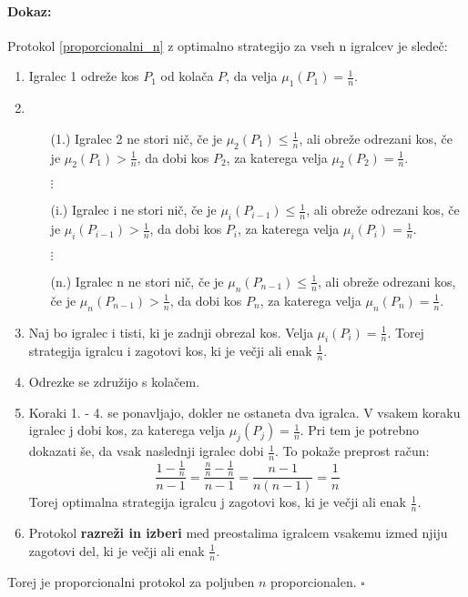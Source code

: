 \documentclass[a4paper, 12pt]{article}
\newenvironment{dokaz}{\paragraph{Dokaz:}}{\hfill$\square$\\}
\begin{document}
	\begin{dokaz}
		Protokol \ref{proporcionalni_n} z optimalno strategijo za vseh n igralcev je sledeč:
		\begin{enumerate}
			
			\item Igralec 1 odreže kos $P_1$ od kolača $P$, da velja $\mu_1 (P_1) = \frac{1}{n}$.
			
			\item \begin{enumerate}
				
				\item[(1.)] Igralec 2 ne stori nič, če je $\mu_2 (P_1) \leq \frac{1}{n}$, ali obreže odrezani kos, če je $\mu_2 (P_1) > \frac{1}{n}$, da dobi kos $P_2$, za katerega velja $\mu_2 (P_2) = \frac{1}{n}$.
				
				\item[] $\vdots$
				
				\item[(i.)] Igralec i ne stori nič, če je $\mu_i (P_{i-1}) \leq \frac{1}{n}$, ali obreže odrezani kos, če je $\mu_i (P_{i-1}) > \frac{1}{n}$, da dobi kos $P_i$, za katerega velja $\mu_i (P_i) = \frac{1}{n}$.
				
				\item[] $\vdots$
				
				\item[(n.)] Igralec n ne stori nič, če je $\mu_n (P_{n-1}) \leq \frac{1}{n}$, ali obreže odrezani kos, če je $\mu_n (P_{n-1}) > \frac{1}{n}$, da dobi kos $P_n$, za katerega velja $\mu_n (P_n) = \frac{1}{n}$.
				
			\end{enumerate}
			
			\item Naj bo igralec i tisti, ki je zadnji obrezal kos. Velja $\mu_i (P_i) = \frac{1}{n}$. Torej strategija igralcu i zagotovi kos, ki je večji ali enak $\frac{1}{n}$.
			
			\item Odrezke se združijo s kolačem.
			
			\item Koraki 1. - 4. se ponavljajo, dokler ne ostaneta dva igralca. V vsakem koraku igralec j dobi kos, za katerega velja $\mu_j (P_j) = \frac{1}{n}$. Pri tem je potrebno dokazati še, da vsak naslednji igralec dobi $\frac{1}{n}$. To pokaže preprost račun:
			$$
			\frac{1 - \frac{1}{n}}{n - 1} = \frac{\frac{n}{n} - \frac{1}{n}}{n - 1} = \frac{n - 1}{n (n - 1)} = \frac{1}{n}
			$$
			Torej optimalna strategija igralcu j zagotovi kos, ki je večji ali enak $\frac{1}{n}$.
			
			\item Protokol \textbf{razreži in izberi} med preostalima igralcem vsakemu izmed njiju zagotovi del, ki je večji ali enak $\frac{1}{n}$.
			
		\end{enumerate}
		Torej je proporcionalni protokol za poljuben $n$ proporcionalen.
	\end{dokaz}
\end{document}

